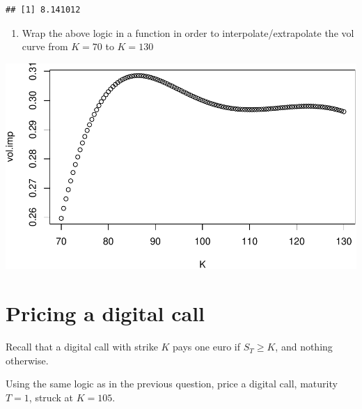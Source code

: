 \documentclass[
]{article}
\providecommand{\tightlist}{%
  \setlength{\itemsep}{0pt}\setlength{\parskip}{0pt}}
\begin{document}
\begin{verbatim}
## [1] 8.141012
\end{verbatim}

\begin{enumerate}
\def\labelenumi{\arabic{enumi}.}
\setcounter{enumi}{5}
\tightlist
\item
  Wrap the above logic in a function in order to interpolate/extrapolate
  the vol curve from \(K=70\) to \(K=130\)
\end{enumerate}

\includegraphics{TP-VannaVolga_files/figure-latex/unnamed-chunk-10-1.pdf}

\hypertarget{pricing-a-digital-call}{%
\section{Pricing a digital call}\label{pricing-a-digital-call}}

Recall that a digital call with strike \(K\) pays one euro if
\(S_T \geq K\), and nothing otherwise.

Using the same logic as in the previous question, price a digital call,
maturity \(T=1\), struck at \(K=105\).
\end{document}
